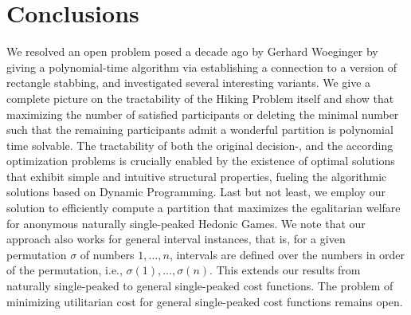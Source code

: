 \documentclass[a4paper]{article}
\begin{document}
\section{Conclusions}
We resolved an open problem posed a decade ago by Gerhard Woeginger by giving a polynomial-time algorithm via establishing a connection to a version of rectangle stabbing, and investi\-ga\-ted several interesting variants. We give a complete picture on the tractability of the Hiking Problem itself and show that maximizing the number of satisfied participants or deleting the minimal number such that the remaining participants admit a wonderful partition is polynomial time solvable. The tractability of both the original decision-, and the according optimization problems is crucially enabled by the existence of optimal solutions that exhibit simple and intuitive structural properties, fueling the algorithmic solutions based on Dynamic Programming. Last but not least, we employ our solution to efficiently compute a partition that maximizes
the egalitarian welfare for anonymous naturally single-peaked Hedonic Games. We note that our approach also works for general interval instances, that is, for a given permutation $\sigma$ of numbers $1,\dots,n$, intervals are defined over the numbers in order of the permutation, i.e., $\sigma(1), \dots ,\sigma(n)$. This extends our results from naturally single-peaked to general single-peaked cost functions. The problem of minimizing utilitarian cost for general single-peaked cost functions remains open. 
\end{document}
